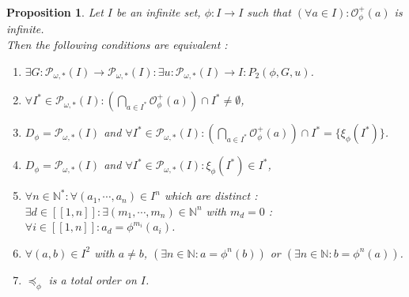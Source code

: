 \documentclass[a4paper,11pt]{article}
\theoremstyle{plain}
\newtheorem{proposition}{Proposition}[section]
\theoremstyle{definition}
\theoremstyle{remark}
\begin{document}
\begin{proposition}
\label{propOrbitsInfiniteGuExistEquiv}
Let $I$ be an infinite set, $\phi : I \to I$ such that $(\forall a \in I) : \mathcal{O}^{+}_\phi(a)$ is infinite. \\
Then the following conditions are equivalent :
\begin{enumerate}
\item $\exists G : \mathcal{P}_{\omega,*}(I) \to \mathcal{P}_{\omega,*}(I) : \exists u : \mathcal{P}_{\omega,*}(I) \to I : P_2(\phi,G,u)$.
\item $\forall I^* \in \mathcal{P}_{\omega,*}(I) : \left( \bigcap_{a \in I^*} \mathcal{O}^{+}_\phi(a) \right) \cap I^* \neq \emptyset$,
\item $D_\phi = \mathcal{P}_{\omega,*}(I)$ and $\forall I^* \in \mathcal{P}_{\omega,*}(I) : \left( \bigcap_{a \in I^*} \mathcal{O}^{+}_\phi(a) \right) \cap I^* = \{\xi_\phi(I^*)\}$.
\item $D_\phi = \mathcal{P}_{\omega,*}(I)$ and $\forall I^* \in \mathcal{P}_{\omega,*}(I) : \xi_\phi(I^*) \in I^*$,
\item $\forall n \in \mathbb{N}^* : \forall (a_1,\cdots,a_n) \in I^n$ which are distinct : $\exists d \in [\![1,n]\!] : \exists (m_1,\cdots,m_n) \in \mathbb{N}^n$ with $m_d = 0$ : $\forall i \in [\![1,n]\!] : a_d = \phi^{m_i}(a_i)$.
\item $\forall (a,b) \in I^2$ with $a \neq b$, $(\exists n \in \mathbb{N} : a = \phi^n(b))$ or $(\exists n \in \mathbb{N} : b = \phi^n(a))$.
\item $\preceq_\phi$ is a total order on $I$.
\end{enumerate}
\end{proposition}
\end{document}
